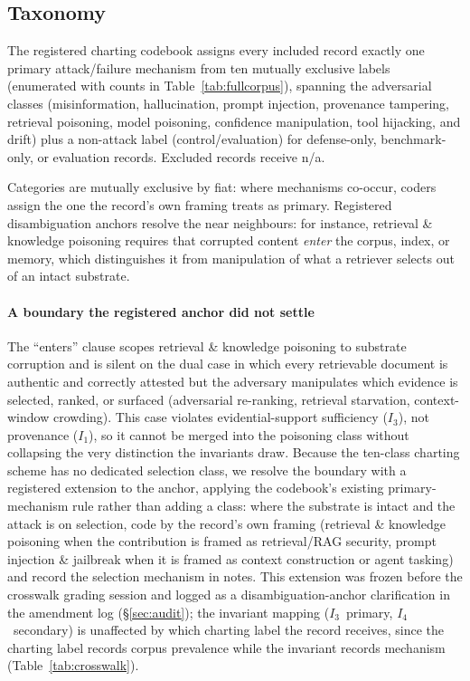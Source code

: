 \documentclass[conference]{IEEEtran}
\newcommand{\Ione}{\ensuremath{I_1}}
\newcommand{\Ithree}{\ensuremath{I_3}}
\newcommand{\Ifour}{\ensuremath{I_4}}
\begin{document}
\subsection{Taxonomy}
\label{sec:taxonomy}
The registered charting codebook assigns every included record
exactly one primary attack/failure mechanism from ten mutually
exclusive labels (enumerated with counts in
Table~\ref{tab:fullcorpus}), spanning the adversarial classes
(misinformation, hallucination, prompt injection, provenance
tampering, retrieval poisoning, model poisoning, confidence
manipulation, tool hijacking, and drift) plus a non-attack label
(control/evaluation) for defense-only, benchmark-only, or
evaluation records. Excluded records receive n/a.

Categories are mutually exclusive by fiat: where mechanisms
co-occur, coders assign the one the record's own framing treats as
primary. Registered disambiguation anchors resolve the near
neighbours: for instance, retrieval \& knowledge poisoning
requires that corrupted content \emph{enter} the corpus, index, or
memory, which distinguishes it from manipulation of what a
retriever selects out of an intact substrate.

\paragraph*{A boundary the registered anchor did not settle}
The ``enters'' clause scopes retrieval \& knowledge poisoning to
substrate corruption and is silent on the dual case in which every
retrievable document is authentic and correctly attested but the
adversary manipulates which evidence is selected, ranked, or
surfaced (adversarial re-ranking, retrieval starvation,
context-window crowding). This case violates evidential-support
sufficiency (\Ithree), not provenance (\Ione), so it cannot be
merged into the poisoning class without collapsing the very
distinction the invariants draw. Because the ten-class charting
scheme has no dedicated selection class, we resolve the boundary
with a registered extension to the anchor, applying the codebook's
existing primary-mechanism rule rather than adding a class: where
the substrate is intact and the attack is on selection, code by
the record's own framing (retrieval \& knowledge poisoning when
the contribution is framed as retrieval/RAG security, prompt
injection \& jailbreak when it is framed as context construction
or agent tasking) and record the selection mechanism in notes.
This extension was frozen before the crosswalk grading session and
logged as a disambiguation-anchor clarification in the amendment
log (\S\ref{sec:audit}); the invariant mapping (\Ithree\ primary,
\Ifour\ secondary) is unaffected by which charting label the
record receives, since the charting label records corpus
prevalence while the invariant records mechanism
(Table~\ref{tab:crosswalk}).
\end{document}
